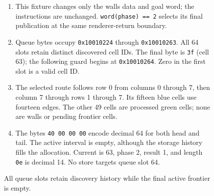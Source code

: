 \begin{figure}[htbp]
  \par\smallskip
  \begin{minipage}{\linewidth}
    \small
    \begin{enumerate}
      \item This fixture changes only the walls data and goal word; the instructions are unchanged. \texttt{word(phase) == 2} selects its final publication at the same renderer-return boundary.
      \item Queue bytes occupy \texttt{0x10010224} through \texttt{0x10010263}. All 64 slots retain distinct discovered cell IDs. The final byte is \texttt{3f} (cell 63); the following guard begins at \texttt{0x10010264}. Zero in the first slot is a valid cell ID.
      \item The selected route follows row 0 from columns 0 through 7, then column 7 through rows 1 through 7. Its fifteen blue cells use fourteen edges. The other 49 cells are processed green cells; none are walls or pending frontier cells.
      \item The bytes \texttt{40 00 00 00} encode decimal 64 for both head and tail. The active interval is empty, although the storage history fills the allocation. Current is 63, phase 2, result 1, and length \texttt{0e} is decimal 14. No store targets queue slot 64.
    \end{enumerate}
  \end{minipage}
  \caption{All queue slots retain discovery history while the final active frontier is empty.}
  \label{capture:010-maze-explorer-f04-full}
  \label{maze-f04-full}
\end{figure}
\par

